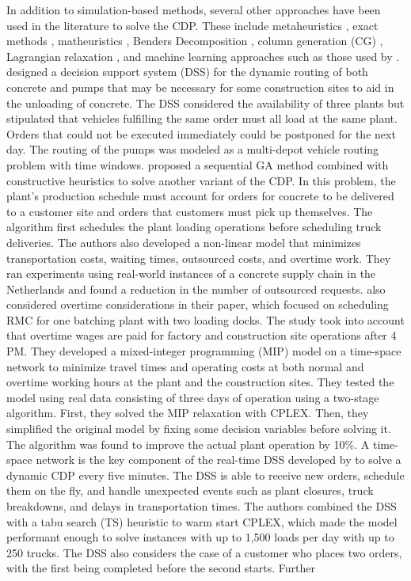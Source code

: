 \documentclass{article}
\begin{document}
In addition to simulation-based methods, several other approaches have been used in the literature to solve the CDP. These include metaheuristics \citep{faria2006distributed, misir2011selection, maghrebi2016sequential, yang2022concrete}, exact methods \citep{yan2007optimal, asbach2009analysis, kinable2014concrete}, matheuristics \citep{schmid2009hybrid, schmid2010hybridization}, Benders Decomposition \citep{maghrebi2014benders}, column generation (CG) \citep{maghrebi2014solving, maghrebi2016column}, Lagrangian relaxation \citep{narayanan2015using}, and machine learning approaches such as those used by \cite{graham2006modeling, maghrebi2014exploring, maghrebi2016matching}. \cite{matsatsinis2004towards} designed a decision support system (DSS) for the dynamic routing of both concrete and pumps that may be necessary for some construction sites to aid in the unloading of concrete. The DSS considered the availability of three plants but stipulated that vehicles fulfilling the same order must all load at the same plant. Orders that could not be executed immediately could be postponed for the next day. The routing of the pumps was modeled as a multi-depot vehicle routing problem with time windows. \cite{naso2007genetic} proposed a sequential GA method combined with constructive heuristics to solve another variant of the CDP. In this problem, the plant's production schedule must account for orders for concrete to be delivered to a customer site and orders that customers must pick up themselves. The algorithm first schedules the plant loading operations before scheduling truck deliveries. The authors also developed a non-linear model that minimizes transportation costs, waiting times, outsourced costs, and overtime work. They ran experiments using real-world instances of a concrete supply chain in the Netherlands and found a reduction in the number of outsourced requests. \cite{yan2007optimal} also considered overtime considerations in their paper, which focused on scheduling RMC for one batching plant with two loading docks. The study took into account that overtime wages are paid for factory and construction site operations after 4 PM. They developed a mixed-integer programming (MIP) model on a time-space network to minimize travel times and operating costs at both normal and overtime working hours at the plant and the construction sites. They tested the model using real data consisting of three days of operation using a two-stage algorithm. First, they solved the MIP relaxation with CPLEX. Then, they simplified the original model by fixing some decision variables before solving it. The algorithm was found to improve the actual plant operation by 10\%. A time-space network is the key component of the real-time DSS developed by \cite{durbin2008or} to solve a dynamic CDP every five minutes. The DSS is able to receive new orders, schedule them on the fly, and handle unexpected events such as plant closures, truck breakdowns, and delays in transportation times. The authors combined the DSS with a tabu search (TS) heuristic to warm start CPLEX, which made the model performant enough to solve instances with up to 1,500 loads per day with up to 250 trucks. The DSS also considers the case of a customer who places two orders, with the first being completed before the second starts. Further 
\end{document}
